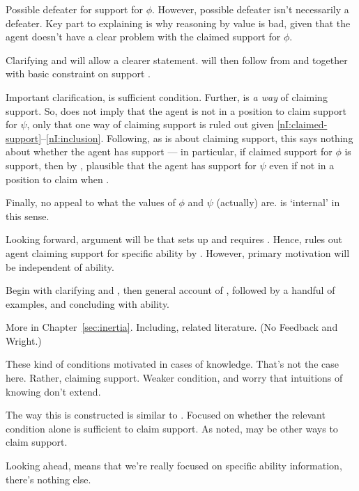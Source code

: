 \newpage

\begin{note}
  Possible defeater for support for \(\phi\).
  However, possible defeater isn't necessarily a defeater.
  Key part to explaining \nI{} is why reasoning by value is bad, given that the agent doesn't have a clear problem with the claimed support for \(\phi\).

  Clarifying \incl{} and \RBV{} will allow a clearer statement.
  \nI{} will then follow from \incl{} and \RBV{} together with basic constraint on support \eiS{}.

  Important clarification, \nI{} is sufficient condition.
  Further, \RBV{} is \emph{a way} of claiming support.
  So, \nI{} does not imply that the agent is not in a position to claim support for \(\psi\), only that one way of claiming support is ruled out given \ref{nI:claimed-support}--\ref{nI:inclusion}.
  Following, as \nI{} is about claiming support, this says nothing about whether the agent has support --- in particular, if claimed support for \(\phi\) is support, then by \incl{}, plausible that the agent has support for \(\psi\) even if not in a position to claim when \RBV{}.

  Finally, no appeal to what the values of \(\phi\) and \(\psi\) (actually) are.
  \nI{} is `internal' in this sense.

  \color{red}
  Looking forward, argument will be that \gsi{} sets up \incl{} and \AR{} requires \RBV{}.
  Hence, \nI{} rules out agent claiming support for specific ability by \AR{}.
  However, primary motivation will be independent of ability.

  Begin with clarifying \incl{} and \RBV{}, then general account of \nI{}, followed by a handful of examples, and concluding with ability.

  More in Chapter~\ref{sec:inertia}.
  Including, related literature. (No Feedback and Wright.)
\end{note}

\begin{note}
  These kind of conditions motivated in cases of knowledge.
  That's not the case here.
  Rather, claiming support.
  Weaker condition, and worry that intuitions of knowing don't extend.

  The way this is constructed is similar to \citeauthor{Wright:2011wn}.
  Focused on whether the relevant condition alone is sufficient to claim support.
  As noted, may be other ways to claim support.

  Looking ahead, \gsi{} means that we're really focused on specific ability information, there's nothing else.
\end{note}

